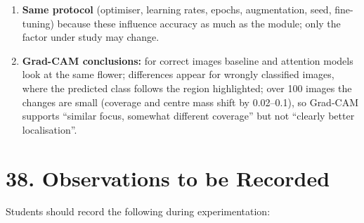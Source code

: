 \documentclass[10pt]{article}
\begin{document}
\begin{enumerate}
\item \textbf{Same protocol} (optimiser, learning rates, epochs, augmentation, seed, fine-tuning) because these influence accuracy as much as the module; only the factor under study may change.
\item \textbf{Grad-CAM conclusions:} for correct images baseline and attention models look at the same flower; differences appear for wrongly classified images, where the predicted class follows the region highlighted; over 100 images the changes are small (coverage and centre mass shift by 0.02--0.1), so Grad-CAM supports ``similar focus, somewhat different coverage'' but not ``clearly better localisation''.
\end{enumerate}


\section*{38. Observations to be Recorded}

Students should record the following during experimentation:
\end{document}
